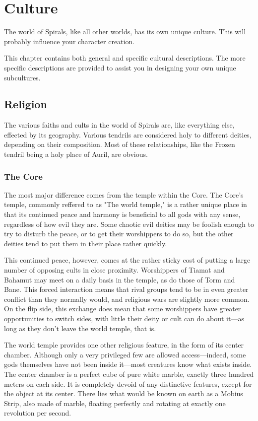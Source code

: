 \chapter{Culture}
The world of Spirals, like all other worlds, has its own unique culture.
This will probably influence your character creation.

This chapter contains both general and specific cultural descriptions.
The more specific descriptions are provided to assist you in designing your own unique subcultures.

\begin{multicols}{2}
\section{Religion}
The various faiths and cults in the world of Spirals are, like everything else, effected by its geography.
Various tendrils are considered holy to different deities, depending on their composition.
Most of these relationships, like the Frozen tendril being a holy place of Auril, are obvious.

\subsection{The Core}
The most major difference comes from the temple within the Core. 
The Core's temple, commonly reffered to as "The world temple," is a rather unique place in that its continued peace and harmony is beneficial to all gods with any sense, regardless of how evil they are.
Some chaotic evil deities may be foolish enough to try to disturb the peace, or to get their worshippers to do so, but the other deities tend to put them in their place rather quickly.

This continued peace, however, comes at the rather sticky cost of putting a large number of opposing cults in close proximity.
Worshippers of Tiamat and Bahamut may meet on a daily basis in the temple, as do those of Torm and Bane.
This forced interaction means that rival groups tend to be in even greater conflict than they normally would, and religious wars are slightly more common.
On the flip side, this exchange does mean that some worshippers have greater opportunities to switch sides, with little their deity or cult can do about it---as long as they don't leave the world temple, that is.

The world temple provides one other religious feature, in the form of its center chamber.
Although only a very privileged few are allowed access---indeed, some gods themselves have not been inside it---most creatures know what exists inside.
The center chamber is a perfect cube of pure white marble, exactly three hundred meters on each side.
It is completely devoid of any distinctive features, except for the object at its center.
There lies what would be known on earth as a Mobius Strip, also made of marble, floating perfectly and rotating at exactly one revolution per second.


\end{multicols}
